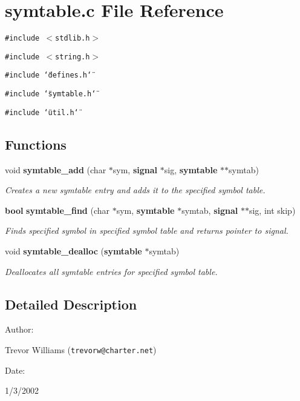 \section{symtable.c File Reference}
\label{symtable_8c}
{\tt \#include $<$stdlib.h$>$}\par
{\tt \#include $<$string.h$>$}\par
{\tt \#include \char`\"{}defines.h\char`\"{}}\par
{\tt \#include \char`\"{}symtable.h\char`\"{}}\par
{\tt \#include \char`\"{}util.h\char`\"{}}\par
\subsection*{Functions}
\begin{CompactItemize}
\item 
void {\bf symtable\_\-add} (char $\ast$sym, {\bf signal} $\ast$sig, {\bf symtable} $\ast$$\ast$symtab)
\begin{CompactList}\small\item\em Creates a new symtable entry and adds it to the specified symbol table.\item\end{CompactList}\item 
{\bf bool} {\bf symtable\_\-find} (char $\ast$sym, {\bf symtable} $\ast$symtab, {\bf signal} $\ast$$\ast$sig, int skip)
\begin{CompactList}\small\item\em Finds specified symbol in specified symbol table and returns pointer to signal.\item\end{CompactList}\item 
void {\bf symtable\_\-dealloc} ({\bf symtable} $\ast$symtab)
\begin{CompactList}\small\item\em Deallocates all symtable entries for specified symbol table.\item\end{CompactList}\end{CompactItemize}


\subsection{Detailed Description}


\begin{Desc}
\item[Author: ]\par
Trevor Williams ({\tt trevorw@charter.net}) \end{Desc}
\begin{Desc}
\item[Date: ]\par
1/3/2002\end{Desc}


